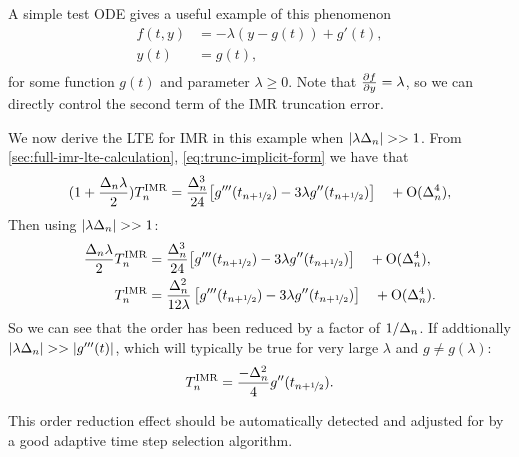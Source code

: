 A simple test ODE gives a useful example of this phenomenon \cite[157]{Atkinson2009}
\begin{equation}
  \label{eqn:imr-test-order-reduction}
  \begin{aligned}
    f(t, y) &= -\lambda (y - g(t)) + g'(t), \\
    y(t) &= g(t), \\
  \end{aligned}
\end{equation}
for some function $g(t)$ and parameter $\lambda \geq 0$.
Note that $\frac{\partial f}{\partial y} = \lambda$, so we can directly control the second term of the IMR truncation error.

We now derive the LTE for IMR in this example when $\left|{\lambda\Delta_{n}} \right| >> 1$.
From \autoref{sec:full-imr-lte-calculation}, \eqref{eq:trunc-implicit-form} we have that
\begin{equation}
  \begin{aligned}
    (1 + \frac{\Delta_{n} \lambda}{2})T_n^{\text{IMR}} &= \frac{\Delta_{n}^3}{24}
    {\left[ g'''(t_{n+\nicefrac{1}{2}}) - 3 \lambda g''(t_{n+\nicefrac{1}{2}}) \right]} \quad + \text{O}(\Delta_{n}^4), \\ 
  \end{aligned}
\end{equation}
Then using $\left|{\lambda\Delta_{n}} \right| >> 1$:
\begin{equation}
  \begin{aligned}
    \frac{\Delta_{n} \lambda}{2} T_n^{\text{IMR}} &= \frac{\Delta_{n}^3}{24}
    {\left[ g'''(t_{n+\nicefrac{1}{2}}) - 3 \lambda g''(t_{n+\nicefrac{1}{2}}) \right]} \quad + \text{O}(\Delta_{n}^4), \\ 
    T_n^{\text{IMR}} &= \frac{\Delta_{n}^2}{12\lambda} \left[g'''(t_{n+\nicefrac{1}{2}}) - 3 \lambda g''(t_{n+\nicefrac{1}{2}}) \right] \quad + \text{O}(\Delta_{n}^4).
  \end{aligned}
\end{equation}
So we can see that the order has been reduced by a factor of $1/\Delta_{n}$.
If addtionally $\left|{\lambda\Delta_{n}} \right| >> \left|{g'''(t)} \right|$, which will typically be true for very large $\lambda$ and $g \neq g(\lambda)$:
\begin{equation}
  T_n^{\text{IMR}} = \frac{-\Delta_{n}^2}{4} g''(t_{n+\nicefrac{1}{2}}).
  \label{eq:reduced-order-imr-truncation-error}
\end{equation}

This order reduction effect should be automatically detected and adjusted for by a good adaptive time step selection algorithm.



